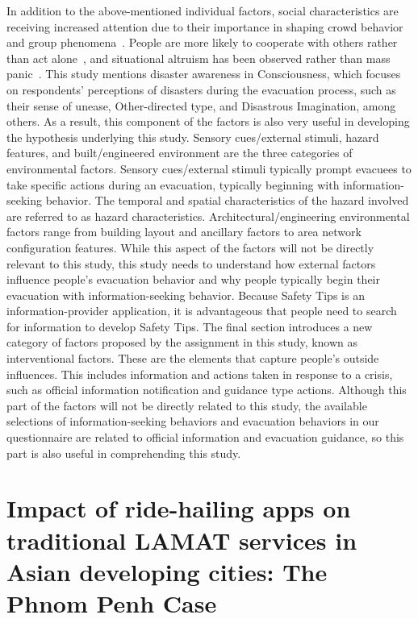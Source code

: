In addition to the above-mentioned individual factors, social characteristics are receiving increased attention due to their importance in shaping crowd behavior and group phenomena~\cite{ref10}. People are more likely to cooperate with others rather than act alone~\cite{ref11}, and situational altruism has been observed rather than mass panic~\cite{ref12}. This study mentions disaster awareness in Consciousness, which focuses on respondents' perceptions of disasters during the evacuation process, such as their sense of unease, Other-directed type, and Disastrous Imagination, among others. As a result, this component of the factors is also very useful in developing the hypothesis underlying this study. 
Sensory cues/external stimuli, hazard features, and built/engineered environment are the three categories of environmental factors. Sensory cues/external stimuli typically prompt evacuees to take specific actions during an evacuation, typically beginning with information-seeking behavior. The temporal and spatial characteristics of the hazard involved are referred to as hazard characteristics. Architectural/engineering environmental factors range from building layout and ancillary factors to area network configuration features. While this aspect of the factors will not be directly relevant to this study, this study needs to understand how external factors influence people's evacuation behavior and why people typically begin their evacuation with information-seeking behavior. Because Safety Tips is an information-provider application, it is advantageous that people need to search for information to develop Safety Tips. 
The final section introduces a new category of factors proposed by the assignment in this study, known as interventional factors. These are the elements that capture people's outside influences. This includes information and actions taken in response to a crisis, such as official information notification and guidance type actions. Although this part of the factors will not be directly related to this study, the available selections of information-seeking behaviors and evacuation behaviors in our questionnaire are related to official information and evacuation guidance, so this part is also useful in comprehending this study.

\section{Impact of ride-hailing apps on traditional LAMAT services in Asian developing cities: The Phnom Penh Case}

